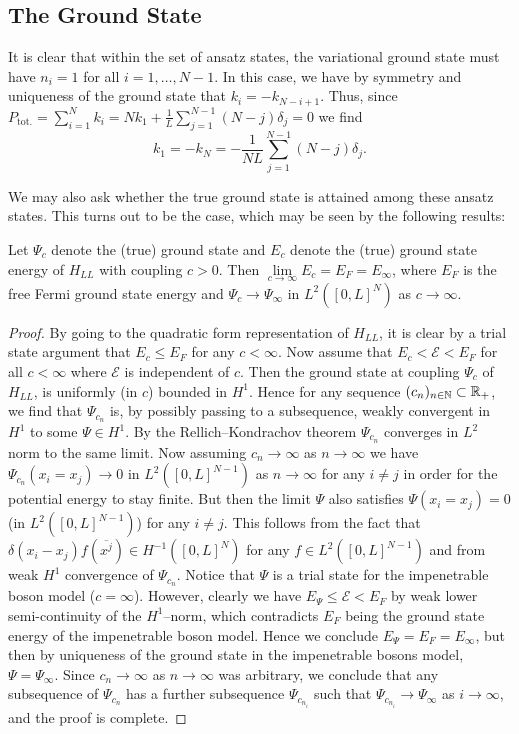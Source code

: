 	\subsection{The Ground State}
	It is clear that within the set of ansatz states, the variational ground state must have $ n_i=1 $ for all $ i=1,\ldots, N-1 $. In this case, we have by symmetry and uniqueness of the ground state that $ k_i=-k_{N-i+1} $. Thus, since $ P_{\text{tot.}}=\sum_{i=1}^{N}k_i=Nk_1+\frac{1}{L}\sum_{j=1}^{N-1}(N-j)\delta_j=0 $ we find $$ k_1=-k_N=-\frac{1}{NL}\sum_{j=1}^{N-1}(N-j)\delta_j.$$
	
	We may also ask whether the true ground state is attained among these ansatz states. This turns out to be the case, which may be seen by the following results:
	\begin{lemma}\label{LemmaLLTrueGroundState}
		Let $ \Psi_c $ denote the (true) ground state and $ E_c $ denote the (true) ground state energy of $ H_{LL} $ with coupling $ c>0 $. Then $ \lim\limits_{c\to\infty}E_c=E_F=E_\infty $, where $ E_F $ is the free Fermi ground state energy and $ \Psi_c\to \Psi_{\infty} $ in $ L^2([0,L]^N) $ as $ c \to\infty $.
	\end{lemma}
	\begin{proof}
		By going to the quadratic form representation of $ H_{LL} $, it is clear by a trial state argument that $ E_c\leq E_F $ for any $ c<\infty $. Now assume that $ E_c<\mathcal{E}<E_F $ for all $ c<\infty $ where $ \mathcal{E} $ is independent of $ c $. Then the ground state at coupling $ \Psi_c $ of $ H_{LL} $, is uniformly (in $ c $) bounded in $ H^1 $. Hence for any sequence $ (c_n)_{n\in\mathbb{N}}\subset\mathbb{R}_+ $, we find that $ \Psi_{c_n} $ is, by possibly passing to a subsequence, weakly convergent in $ H^1 $ to some $ \Psi\in H^1 $. By the Rellich--Kondrachov theorem $ \Psi_{c_n} $ converges in $ L^2 $ norm to the same limit. Now assuming $ c_n\to\infty $ as $ n\to\infty $ we have $ \Psi_{c_n}(x_i=x_j)\to 0 $ in $ L^2([0,L]^{N-1}) $ as $ n\to\infty $ for any $ i\neq j $ in order for the potential energy to stay finite. But then the limit $ \Psi $ also satisfies $ \Psi(x_i=x_j)=0 $ (in $ L^2([0,L]^{N-1}) $) for any $ i\neq j $. This follows from the fact that $ \delta(x_i-x_j)f(\overline{x^j})\in H^{-1}([0,L]^{N}) $ for any $ f\in L^2([0,L]^{N-1}) $ and from weak $ H^1 $ convergence of $ \Psi_{c_n} $. Notice that $ \Psi $ is a trial state for the impenetrable boson model ($ c=\infty $). However, clearly we have $ E_\Psi\leq \mathcal{E}<E_F $ by weak lower semi-continuity of the $ H^1 $--norm, which contradicts $ E_F $ being the ground state energy of the impenetrable boson model. Hence we conclude $ E_\Psi=E_F=E_\infty $, but then by uniqueness of the ground state in the impenetrable bosons model, $ \Psi=\Psi_\infty $. Since $ c_n\to \infty $ as $ n\to\infty $ was arbitrary, we conclude that any subsequence of $ \Psi_{c_n} $ has a further subsequence $ \Psi_{c_{n_i}} $ such that $ \Psi_{c_{n_i}}\to\Psi_\infty $ as $ i\to\infty $, and the proof is complete. 
	\end{proof}
